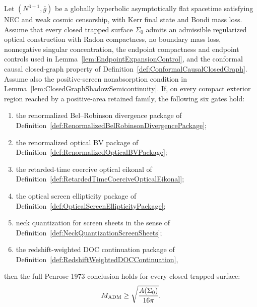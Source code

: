 \begin{theorem}\label{thm:SixGatePenroseWorkingPath}
Let $(N^{3+1},\bar g)$ be a globally hyperbolic asymptotically flat spacetime satisfying NEC and weak cosmic censorship, with Kerr final state and Bondi mass loss. Assume that every closed trapped surface $\Sigma_0$ admits an admissible regularized optical construction with Radon compactness, no boundary mass loss, nonnegative singular concentration, the endpoint compactness and endpoint controls used in Lemma~\ref{lem:EndpointExpansionControl}, and the conformal causal closed-graph property of Definition~\ref{def:ConformalCausalClosedGraph}. Assume also the positive-screen nonabsorption condition in Lemma~\ref{lem:ClosedGraphShadowSemicontinuity}. If, on every compact exterior region reached by a positive-area retained family, the following six gates hold:
\begin{enumerate}
    \item the renormalized Bel--Robinson divergence package of Definition~\ref{def:RenormalizedBelRobinsonDivergencePackage};
    \item the renormalized optical BV package of Definition~\ref{def:RenormalizedOpticalBVPackage};
    \item the retarded-time coercive optical eikonal of Definition~\ref{def:RetardedTimeCoerciveOpticalEikonal};
    \item the optical screen ellipticity package of Definition~\ref{def:OpticalScreenEllipticityPackage};
    \item neck quantization for screen sheets in the sense of Definition~\ref{def:NeckQuantizationScreenSheets};
    \item the redshift-weighted DOC continuation package of Definition~\ref{def:RedshiftWeightedDOCContinuation},
\end{enumerate}
then the full Penrose 1973 conclusion holds for every closed trapped surface:
\[
    M_{\mathrm{ADM}}\ge \sqrt{\frac{A(\Sigma_0)}{16\pi}} .
\]
\end{theorem}

